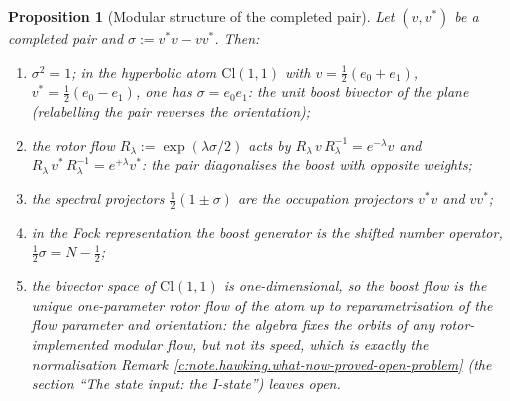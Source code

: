 \documentclass[11pt]{article}
\newtheorem{proposition}[theorem]{Proposition}
\theoremstyle{definition}
\theoremstyle{plain}
\newcommand{\changedmark}[2]{\marginpar{\raggedright\scriptsize\color{#1}#2}}
\providecommand{\Cl}{}\renewcommand{\Cl}{\mathrm{Cl}}
\begin{document}
\begin{proposition}[Modular structure of the completed pair]\label{c:hawking.modular-structure-completed-pair}
\changedmark{gray}{reworded}
Let $(v, v^*)$ be a completed pair and $\sigma := v^*v - vv^*$. Then:
\begin{enumerate}
\item $\sigma^2 = 1$; in the hyperbolic atom $\Cl(1,1)$ with $v = \tfrac12(e_0 + e_1)$, $v^* = \tfrac12(e_0 - e_1)$, one has $\sigma = e_0 e_1$: the unit boost bivector of the plane (relabelling the pair reverses the orientation);
\item the rotor flow $R_\lambda := \exp(\lambda\sigma/2)$ acts by $R_\lambda\, v\, R_\lambda^{-1} = e^{-\lambda}v$ and $R_\lambda\, v^*\, R_\lambda^{-1} = e^{+\lambda}v^*$: the pair diagonalises the boost with opposite weights;
\item the spectral projectors $\tfrac12(1 \pm \sigma)$ are the occupation projectors $v^*v$ and $vv^*$;
\item in the Fock representation the boost generator is the shifted number operator, $\tfrac12\sigma = N - \tfrac12$;
\item the bivector space of $\Cl(1,1)$ is one-dimensional, so the boost flow is the unique one-parameter rotor flow of the atom \emph{up to reparametrisation of the flow parameter and orientation}: the algebra fixes the orbits of any rotor-implemented modular flow, but not its speed, which is exactly the normalisation Remark \ref{c:note.hawking.what-now-proved-open-problem} (the section ``The state input: the I-state'') leaves open.
\end{enumerate}
\end{proposition}
\end{document}
